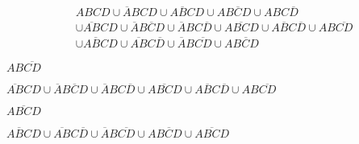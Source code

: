 \documentclass[12pt,letterpaper,boxed]{hmcpset}
\begin{document}
\begin{CJK}{UTF8}{}
  
  \begin{solution}[(1)]
    \begin{align*}
      &ABCD \cup \overline{A}BCD \cup A\overline{B}CD \cup AB\overline{C}D \cup ABC\overline{D} \\  
      &\cup \overline{AB}CD \cup \overline{A}B\overline{C}D \cup \overline{A}BC\overline{D} 
      \cup A\overline{BC}D \cup A\overline{B}C\overline{D} \cup AB\overline{CD} \\
      &\cup \overline{ABC}D \cup \overline{AB}C\overline{D} \cup \overline{A}B\overline{CD} \cup A\overline{BCD}  
    \end{align*}
  \end{solution}
  \begin{solution}[(2)]
    $AB\overline{CD}$
  \end{solution}
  \begin{solution}[(3)]
    $\overline{AB}CD \cup \overline{A}B\overline{C}D \cup \overline{A}BC\overline{D} 
      \cup A\overline{BC}D \cup A\overline{B}C\overline{D} \cup AB\overline{CD}$
  \end{solution}
  \begin{solution}[(4)]
    $\overline{ABCD}$
  \end{solution}
  \begin{solution}[(5)]
    $\overline{ABC}D \cup \overline{AB}C\overline{D} \cup \overline{A}B\overline{CD} \cup A\overline{BCD} \cup \overline{ABCD}$
  \end{solution}




\end{CJK}
\end{document}
